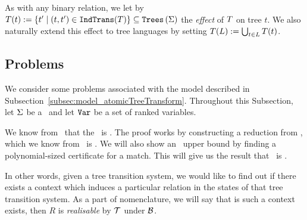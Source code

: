 As with any binary relation, we let by $T(t) := \left\{ t' \mid (t, t') \in \texttt{IndTrans}(T) \right\} \subseteq \texttt{Trees}\left(\Sigma\right)$ the \emph{effect} of $T$ on tree $t$. We also naturally extend this effect to tree languages by setting $T(L) := \bigcup_{t \in L} T(t)$.


\subsection{Problems}\label{subsec:problems_atomicTreeTransform}

We consider some problems associated with the model described in Subsection~\ref{subsec:model_atomicTreeTransform}. Throughout this Subsection, let $\Sigma$ be a \rab\ and let $\texttt{Var}$ be a set of ranked variables.

\begin{problem}\label{prb:matchingProblem}
    \problemtitle{\matchingProblemFull}
\end{problem}

We know from~\cite{matchingProblemLowerBound} that the \matchingProblemFull\ is \nph. The proof works by constructing a reduction from \oneInThreeSatFull, which we know from~\cite{oneInThreeSatIsNpHard} is \nph. We will also show an \np\ upper bound by finding a polynomial-sized certificate for a match. This will give us the result that \matchingProblemFull\ is \npc.

\begin{problem}\label{prb:relationRealisabilityProblem}
    \problemtitle{\relationRealisabilityFull}
\end{problem}

In other words, given a tree transition system, we would like to find out if there exists a context which induces a particular relation in the states of that tree transition system. As a part of nomenclature, we will say that is such a context exists, then $R$ is \emph{realisable} by $\mathcal{T}$ under $\mathcal{B}$.

